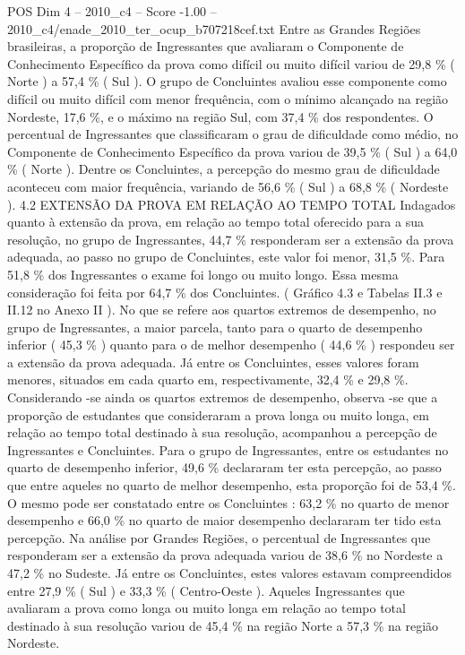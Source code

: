 \begin{textsample}{POS Dim 4 – 2010\_c4 – Score -1.00 – 2010\_c4/enade\_2010\_ter\_ocup\_b707218cef.txt}
Entre as Grandes Regiões brasileiras, a proporção de Ingressantes que avaliaram o Componente de Conhecimento Específico da prova como difícil ou muito difícil variou de 29,8 \% ( Norte ) a 57,4 \% ( Sul ).
O grupo de Concluintes avaliou esse componente como difícil ou muito difícil com menor frequência, com o mínimo alcançado na região Nordeste, 17,6 \%, e o máximo na região Sul, com 37,4 \% dos respondentes.
O percentual de Ingressantes que classificaram o grau de dificuldade como médio, no Componente de Conhecimento Específico da prova variou de 39,5 \% ( Sul ) a 64,0 \% ( Norte ).
Dentre os Concluintes, a percepção do mesmo grau de dificuldade aconteceu com maior frequência, variando de 56,6 \% ( Sul ) a 68,8 \% ( Nordeste ). 4.2 EXTENSÃO DA PROVA EM RELAÇÃO AO TEMPO TOTAL Indagados quanto à extensão da prova, em relação ao tempo total oferecido para a sua resolução, no grupo de Ingressantes, 44,7 \% responderam ser a extensão da prova adequada, ao passo no grupo de Concluintes, este valor foi menor, 31,5 \%.
Para 51,8 \% dos Ingressantes o exame foi longo ou muito longo.
Essa mesma consideração foi feita por 64,7 \% dos Concluintes. ( Gráfico 4.3 e Tabelas II.3 e II.12 no Anexo II ).
No que se refere aos quartos extremos de desempenho, no grupo de Ingressantes, a maior parcela, tanto para o quarto de desempenho inferior ( 45,3 \% ) quanto para o de melhor desempenho ( 44,6 \% ) respondeu ser a extensão da prova adequada.
Já entre os Concluintes, esses valores foram menores, situados em cada quarto em, respectivamente, 32,4 \% e 29,8 \%.
Considerando -se ainda os quartos extremos de desempenho, observa -se que a proporção de estudantes que consideraram a prova longa ou muito longa, em relação ao tempo total destinado à sua resolução, acompanhou a percepção de Ingressantes e Concluintes.
Para o grupo de Ingressantes, entre os estudantes no quarto de desempenho inferior, 49,6 \% declararam ter esta percepção, ao passo que entre aqueles no quarto de melhor desempenho, esta proporção foi de 53,4 \%.
O mesmo pode ser constatado entre os Concluintes : 63,2 \% no quarto de menor desempenho e 66,0 \% no quarto de maior desempenho declararam ter tido esta percepção.
Na análise por Grandes Regiões, o percentual de Ingressantes que responderam ser a extensão da prova adequada variou de 38,6 \% no Nordeste a 47,2 \% no Sudeste.
Já entre os Concluintes, estes valores estavam compreendidos entre 27,9 \% ( Sul ) e 33,3 \% ( Centro-Oeste ).
Aqueles Ingressantes que avaliaram a prova como longa ou muito longa em relação ao tempo total destinado à sua resolução variou de 45,4 \% na região Norte a 57,3 \% na região Nordeste.

\end{textsample}
